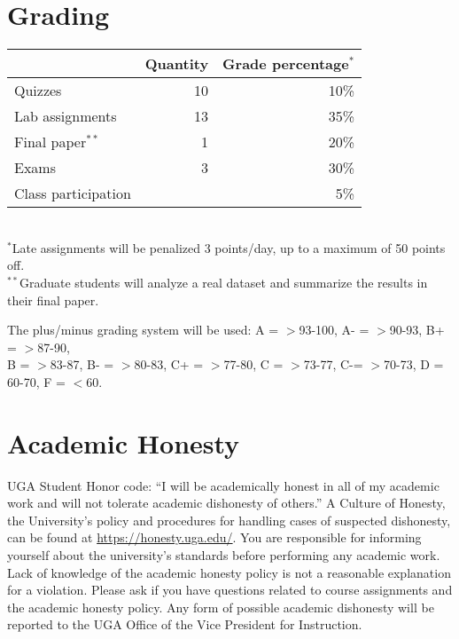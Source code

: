 \documentclass[12pt]{article}
\begin{document}
\section*{\normalsize Grading}
\vspace{-4mm}
\begin{center}
  \begin{tabular}[h!]{lrr}
    \hline
                        & Quantity & Grade percentage$^*$        \\
    \hline
    Quizzes             & 10       & 10\%                        \\
    Lab assignments     & 13       & 35\%                        \\
    Final paper$^{**}$  & 1        & 20\%                        \\
    Exams               & 3        & 30\%                        \\
    Class participation &          & 5\%                         \\
    \hline
  \end{tabular}                                                  \\
  \small
\hspace{0mm} $^*$Late assignments will be penalized 3 points/day, up to a maximum of 50 points off. \\ 
\hspace{0mm} $^{**}$Graduate students will analyze a real dataset and
summarize the results in their final paper.
\end{center}
\vspace{-6pt}
{%
The plus/minus grading system will be used: %
A = $>$93-100, A- = $>$90-93, B+ = $>$87-90,                     \\ B = $>$83-87,
B- = $>$80-83, C+ = $>$77-80, C = $>$73-77, C-= $>$70-73, D = 60-70, F = $<$60. 
}



\vspace{-2mm}
\section*{\normalsize Academic Honesty}
\vspace{-4mm}

UGA Student Honor code: ``I will be academically honest in all of my
academic work and will not tolerate academic dishonesty of others.'' A
Culture of Honesty, the University's policy and procedures for
handling cases of suspected dishonesty, can be found at
\url{https://honesty.uga.edu/}. You are responsible for 
informing yourself about the university's standards before performing
any academic work. Lack of knowledge of the academic honesty policy is
not a reasonable explanation for a violation. Please ask if you have
questions related to course assignments and the academic honesty
policy. Any form of possible academic dishonesty will be reported to
the UGA Office of the Vice President for Instruction.
\end{document}
